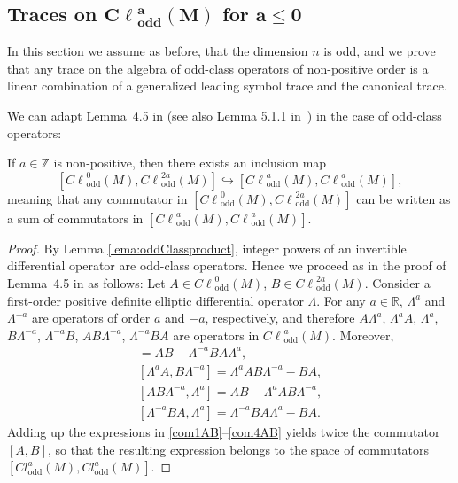 \documentclass[pdftex]{sigma}
\DeclareMathOperator{\odd}{odd} \DeclareMathOperator{\supp}{supp}
\newcommand{\R}{{\mathbb R}}
\newcommand{\Z}{{\mathbb Z}}
\def \Cl {{C\ell}}
\begin{document}
\subsection[Traces on $\Cl^{a}_{\odd}(M)$ for $a\leq0$]{Traces on $\boldsymbol{\Cl^{a}_{\odd}(M)}$ for $\boldsymbol{a\leq0}$}\label{section:classificationZero}

In this section we assume as before, that the dimension $n$ is odd, and we prove that any trace on the algebra of odd-class operators of non-positive order is a linear combination of a generalized leading symbol trace and the canonical trace.

We can adapt Lemma~4.5 in \cite{leschneira} (see also Lemma 5.1.1 in~\cite{neirathesis}) in the case of odd-class operators:
\begin{lemma}\label{commCl02aaaodd}
If $a\in\Z$ is non-positive, then there exists an inclusion map
\[
[\Cl^{0}_{\odd}(M),\Cl^{2a}_{\odd}(M)]\hookrightarrow [\Cl^{a}_{\odd}(M),\Cl^{a}_{\odd}(M)],
\]
meaning that any commutator in $[\Cl^{0}_{\odd}(M),\Cl^{2a}_{\odd}(M)]$ can be written as a sum of commutators in $[\Cl^{a}_{\odd}(M),\Cl^{a}_{\odd}(M)]$.
\end{lemma}

\begin{proof}
By Lemma \ref{lema:oddClassproduct}, integer powers of an invertible dif\/ferential operator are odd-class ope\-ra\-tors. Hence we proceed as in the proof of Lemma~4.5 in \cite{leschneira} as follows:
Let $A\in \Cl^{0}_{\odd}(M)$, $B\in \Cl^{2a}_{\odd}(M)$. Consider a f\/irst-order positive def\/inite elliptic dif\/ferential operator $\Lambda$. For any $a\in\R$, $\Lambda^{a}$ and $\Lambda^{-a}$ are operators of order $a$ and $-a$, respectively, and therefore $A\Lambda^{a}$, $\Lambda^{a}A$, $\Lambda^{a}$, $B\Lambda^{-a}$,  $\Lambda^{-a}B$,  $AB\Lambda^{-a}$, $\Lambda^{-a}BA$ are operators in $\Cl^{a}_{\odd}(M)$. Moreover,
\begin{gather}
 [A\Lambda^{a},\Lambda^{-a}B]=AB-\Lambda^{-a}BA\Lambda^{a},\label{com1AB}\\
 [\Lambda^{a}A,B\Lambda^{-a}]=\Lambda^{a}AB\Lambda^{-a}-BA,\label{com2AB}\\
 [AB\Lambda^{-a},\Lambda^{a}]=AB-\Lambda^{a}AB\Lambda^{-a},\label{com3AB}\\
 [\Lambda^{-a}BA,\Lambda^{a}]=\Lambda^{-a}BA\Lambda^{a}-BA.\label{com4AB}
\end{gather}
Adding up the expressions in \eqref{com1AB}--\eqref{com4AB} yields twice the commutator $[A,B]$, so that the resulting expression belongs to the space of commutators $[Cl^{a}_{\odd}(M),Cl^{a}_{\odd}(M)]$.
\end{proof}
\end{document}
